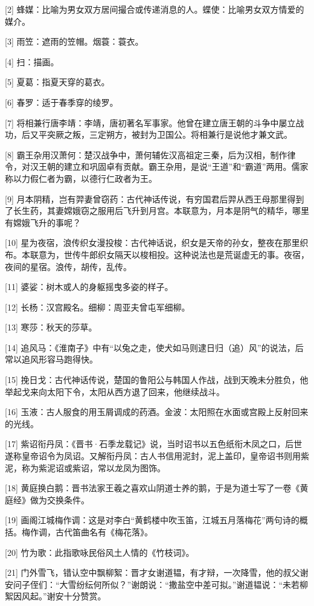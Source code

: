 \documentclass[12pt,UTF8]{ctexbook}
\begin{document}
[2] 蜂媒：比喻为男女双方居间撮合或传递消息的人。蝶使：比喻男女双方情爱的媒介。

[3] 雨笠：遮雨的笠帽。烟蓑：蓑衣。

[4] 扫：描画。

[5] 夏葛：指夏天穿的葛衣。

[6] 春罗：适于春季穿的绫罗。

[7] 将相兼行唐李靖：李靖，唐初著名军事家。他曾在建立唐王朝的斗争中屡立战功，后又平突厥之叛，三定朔方，被封为卫国公。将相兼行是说他才兼文武。

[8] 霸王杂用汉萧何：楚汉战争中，萧何辅佐汉高祖定三秦，后为汉相，制作律令，对汉王朝的建立和巩固卓有贡献。霸王杂用，是说“王道”和“霸道”两用。儒家称以力假仁者为霸，以德行仁政者为王。

[9] 月本阴精，岂有羿妻曾窃药：古代神话传说，有穷国君后羿从西王母那里得到了长生药，其妻嫦娥窃之服用后飞升到月宫。本联意为，月本是阴气的精华，哪里有嫦娥飞升的事呢？

[10] 星为夜宿，浪传织女漫投梭：古代神话说，织女是天帝的孙女，整夜在那里织布。本联意为，世传牛郎织女隔天以梭相投。这种说法也是荒诞虚无的事。夜宿，夜间的星宿。浪传，胡传，乱传。

[11] 婆娑：树木或人的身躯摇曳多姿的样子。

[12] 长杨：汉宫殿名。细柳：周亚夫曾屯军细柳。

[13] 寒莎：秋天的莎草。

[14] 追风马：《淮南子》中有“以兔之走，使犬如马则逮日归（追）风”的说法，后常以追风形容马跑得快。

[15] 挽日戈：古代神话传说，楚国的鲁阳公与韩国人作战，战到天晚未分胜负，他举起戈来向太阳下令，太阳从西方退了回来，他继续战斗。

[16] 玉液：古人服食的用玉屑调成的药酒。金波：太阳照在水面或宫殿上反射回来的光线。

[17] 紫诏衔丹凤：《晋书·石季龙载记》说，当时诏书以五色纸衔木凤之口，后世遂称皇帝诏令为凤诏。又解衔丹凤：古人书信用泥封，泥上盖印，皇帝诏书则用紫泥，称为紫泥诏或紫诏，常以龙凤为图饰。

[18] 黄庭换白鹅：晋书法家王羲之喜欢山阴道士养的鹅，于是为道士写了一卷《黄庭经》做为交换条件。

[19] 画阁江城梅作调：这是对李白“黄鹤楼中吹玉笛，江城五月落梅花”两句诗的概括。梅作调，古代笛曲名有《梅花落》。

[20] 竹为歌：此指歌咏民俗风土人情的《竹枝词》。

[21] 门外雪飞，错认空中飘柳絮：晋才女谢道韫，有才辩，一次降雪，他的叔父谢安问子侄们：“大雪纷纭何所似？”谢朗说：“撒盐空中差可拟。”谢道韫说：“未若柳絮因风起。”谢安十分赞赏。
\end{document}
